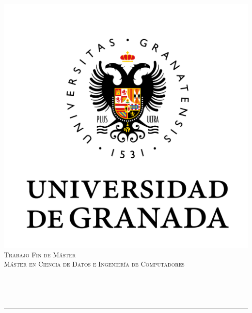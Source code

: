 \documentclass[12pt, spanish]{article}
\begin{document}


\begin{titlepage}
    \centering
    \vspace*{-2cm}
    \includegraphics[scale = 0.50]{ugr.png}\\[0.3 cm]
    \textsc{\large Trabajo Fin de Máster}\\[0.5 cm]
    \textsc{\large Máster en Ciencia de Datos e Ingeniería de Computadores}\\[0 cm]
    \rule{\linewidth}{0.2 mm} \\
    { \Large \bfseries \thetitle}\\
    \rule{\linewidth}{0.2 mm} \\[1 cm]


\end{titlepage}
\end{document}
